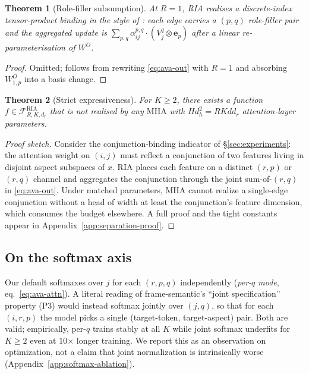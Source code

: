 \documentclass{article}
\newtheorem{theorem}{Theorem}
\newcommand{\RIA}{\mathrm{RIA}}
\newcommand{\AvA}{\RIA}  %
\begin{document}
\begin{theorem}[Role-filler subsumption]
\label{thm:rf}
At $R{=}1$, RIA realises a discrete-index tensor-product binding in the
style of \citet{smolensky1990tensor}: each edge carries a
$(p, q)$ role-filler pair and the aggregated update is
$\sum_{p, q} \alpha^{p,q}_{ij} \cdot (V_j^q \otimes \mathbf{e}_p)$ after
a linear re-parameterisation of $W^O$.
\end{theorem}
\begin{proof}
Omitted; follows from rewriting \eqref{eq:ava-out} with $R{=}1$ and
absorbing $W^O_{1,p}$ into a basis change.
\end{proof}

\begin{theorem}[Strict expressiveness]
\label{thm:strict}
For $K \ge 2$, there exists a function
$f \in \mathcal{F}^{\AvA}_{R, K, d_r}$ that is \emph{not} realised by
any $\mathrm{MHA}$ with $H d_h^2 = R K d d_r$ attention-layer
parameters.
\end{theorem}
\begin{proof}[Proof sketch]
Consider the conjunction-binding indicator of
\S\ref{sec:experiments}: the attention weight on $(i, j)$ must reflect
a conjunction of two features living in disjoint aspect subspaces of
$x$. RIA places each feature on a distinct $(r, p)$ or $(r, q)$ channel
and aggregates the conjunction through the joint sum-of-$(r, q)$ in
\eqref{eq:ava-out}. Under matched parameters, MHA cannot realize a
single-edge conjunction without a head of width at least the
conjunction's feature dimension, which consumes the budget elsewhere.
A full proof and the tight constants appear in
Appendix~\ref{app:separation-proof}.
\end{proof}

\subsection{On the softmax axis}
\label{sec:softmax-mode}

Our default softmaxes over $j$ for each $(r, p, q)$ independently
(\emph{per-$q$ mode}, eq.~\eqref{eq:ava-attn}). A literal reading of
frame-semantic's ``joint specification'' property (P3) would instead
softmax jointly over $(j, q)$, so that for each $(i, r, p)$ the model
picks a single (target-token, target-aspect) pair. Both are valid;
empirically, per-$q$ trains stably at all $K$ while joint softmax
underfits for $K \ge 2$ even at 10$\times$ longer training. We report
this as an observation on optimization, not a claim that joint
normalization is intrinsically worse
(Appendix~\ref{app:softmax-ablation}).
\end{document}
